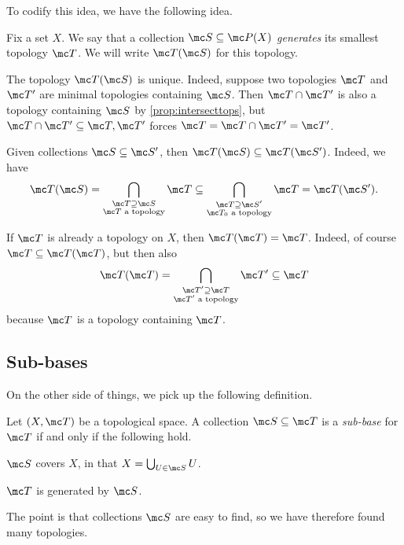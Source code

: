 \documentclass[../notes.tex]{subfiles}
\begin{document}
To codify this idea, we have the following idea.
\begin{defi}
	Fix a set $X$. We say that a collection $\mc S\subseteq\mc P(X)$ \textit{generates} its smallest topology $\mc T$. We will write $\mc T(\mc S)$ for this topology.
\end{defi}
\begin{remark}[Nir]
	The topology $\mc T(\mc S)$ is unique. Indeed, suppose two topologies $\mc T$ and $\mc T'$ are minimal topologies containing $\mc S$. Then $\mc T\cap\mc T'$ is also a topology containing $\mc S$ by \autoref{prop:intersecttops}, but $\mc T\cap\mc T'\subseteq\mc T,\mc T'$ forces $\mc T=\mc T\cap\mc T'=\mc T'$.
\end{remark}
\begin{remark}[Nir] \label{rem:largersubbase}
	Given collections $\mc S\subseteq\mc S'$, then $\mc T(\mc S)\subseteq\mc T(\mc S')$. Indeed, we have
	\[\mc T(\mc S)=\bigcap_{\substack{\mc T\supseteq\mc S\\\mc T\text{ a topology}}}\mc T\subseteq\bigcap_{\substack{\mc T\supseteq\mc S'\\\mc T_0\text{ a topology}}}\mc T=\mc T(\mc S').\]
\end{remark}
\begin{remark}[Nir] \label{rem:topgenitself}
	If $\mc T$ is already a topology on $X$, then $\mc T(\mc T)=\mc T$. Indeed, of course $\mc T\subseteq\mc T(\mc T)$, but then also
	\[\mc T(\mc T)=\bigcap_{\substack{\mc T'\supseteq\mc T\\\mc T'\text{ a topology}}}\mc T'\subseteq\mc T\]
	because $\mc T$ is a topology containing $\mc T$.
\end{remark}

\subsection{Sub-bases}
On the other side of things, we pick up the following definition.
\begin{definition}
	Let $(X,\mc T)$ be a topological space. A collection $\mc S\subseteq\mc T$ is a \textit{sub-base} for $\mc T$ if and only if the following hold.
	\begin{listalph}
		\item $\mc S$ covers $X$, in that $X=\bigcup_{U\in\mc S}U$.
		\item $\mc T$ is generated by $\mc S$.
	\end{listalph}
\end{definition}
The point is that collections $\mc S$ are easy to find, so we have therefore found many topologies.
\end{document}
